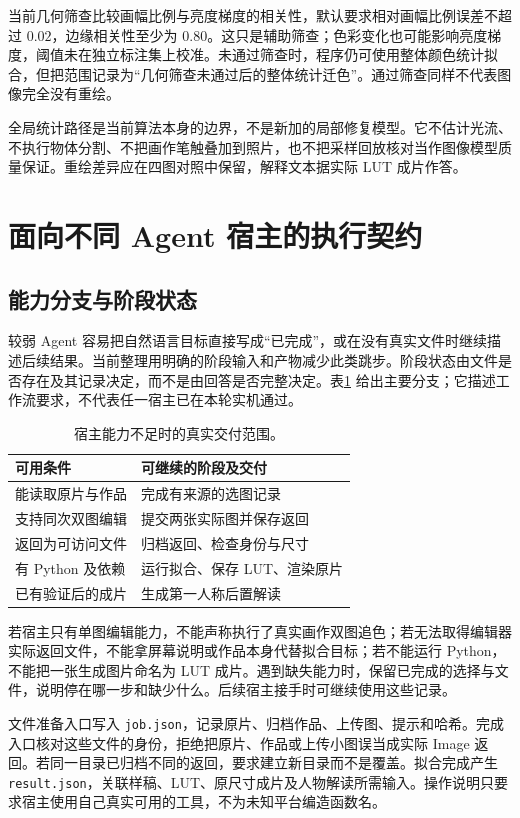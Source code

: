 当前几何筛查比较画幅比例与亮度梯度的相关性，默认要求相对画幅比例误差不超过 $0.02$，边缘相关性至少为 $0.80$。这只是辅助筛查；色彩变化也可能影响亮度梯度，阈值未在独立标注集上校准。未通过筛查时，程序仍可使用整体颜色统计拟合，但把范围记录为“几何筛查未通过后的整体统计迁色”。通过筛查同样不代表图像完全没有重绘。

全局统计路径是当前算法本身的边界，不是新加的局部修复模型。它不估计光流、不执行物体分割、不把画作笔触叠加到照片，也不把采样回放核对当作图像模型质量保证。重绘差异应在四图对照中保留，解释文本据实际 LUT 成片作答。

\section{面向不同 Agent 宿主的执行契约}
\subsection{能力分支与阶段状态}
较弱 Agent 容易把自然语言目标直接写成“已完成”，或在没有真实文件时继续描述后续结果。当前整理用明确的阶段输入和产物减少此类跳步。阶段状态由文件是否存在及其记录决定，而不是由回答是否完整决定。表\ref{tab:capability} 给出主要分支；它描述工作流要求，不代表任一宿主已在本轮实机通过。

\begin{table}[t]
\caption{宿主能力不足时的真实交付范围。}
\label{tab:capability}
\centering\small
\begin{tabular}{p{}p{}}
\hline
可用条件 & 可继续的阶段及交付\\\hline
能读取原片与作品 & 完成有来源的选图记录\\
支持同次双图编辑 & 提交两张实际图并保存返回\\
返回为可访问文件 & 归档返回、检查身份与尺寸\\
有 Python 及依赖 & 运行拟合、保存 LUT、渲染原片\\
已有验证后的成片 & 生成第一人称后置解读\\\hline
\end{tabular}
\end{table}

若宿主只有单图编辑能力，不能声称执行了真实画作双图追色；若无法取得编辑器实际返回文件，不能拿屏幕说明或作品本身代替拟合目标；若不能运行 Python，不能把一张生成图片命名为 LUT 成片。遇到缺失能力时，保留已完成的选择与文件，说明停在哪一步和缺少什么。后续宿主接手时可继续使用这些记录。

文件准备入口写入 \texttt{job.json}，记录原片、归档作品、上传图、提示和哈希。完成入口核对这些文件的身份，拒绝把原片、作品或上传小图误当成实际 Image 返回。若同一目录已归档不同的返回，要求建立新目录而不是覆盖。拟合完成产生 \texttt{result.json}，关联样稿、LUT、原尺寸成片及人物解读所需输入。操作说明只要求宿主使用自己真实可用的工具，不为未知平台编造函数名。


